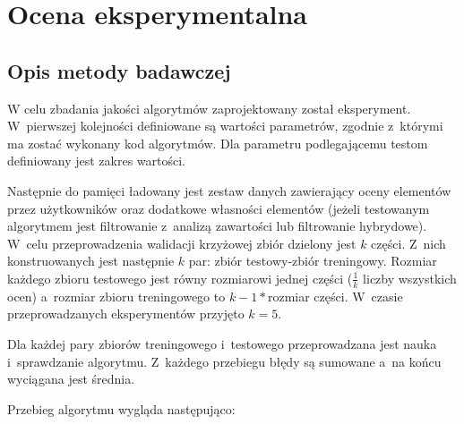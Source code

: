 \documentclass[twoside]{iisthesis}
\begin{document}
\chapter{Ocena eksperymentalna}
	\section{Opis metody badawczej}
	
		W celu zbadania jakości algorytmów zaprojektowany został eksperyment. W~pierwszej kolejności definiowane są wartości parametrów, zgodnie z~którymi ma zostać wykonany kod algorytmów. 
		Dla parametru podlegającemu testom definiowany jest zakres wartości. 
		
		Następnie do pamięci ładowany jest zestaw danych zawierający oceny elementów przez użytkowników oraz dodatkowe własności elementów (jeżeli testowanym algorytmem jest filtrowanie z~analizą zawartości lub filtrowanie hybrydowe). W~celu przeprowadzenia walidacji krzyżowej zbiór dzielony jest $k$ części. Z~nich konstruowanych jest następnie $k$ par: zbiór testowy-zbiór treningowy. Rozmiar każdego zbioru testowego jest równy rozmiarowi jednej części ($\frac{1}{k}$ liczby wszystkich ocen) a~rozmiar zbioru treningowego to $k-1*$rozmiar części. W~czasie przeprowadzanych eksperymentów przyjęto $k=5$.
		
		Dla każdej pary zbiorów treningowego i~testowego przeprowadzana jest nauka i~sprawdzanie algorytmu. Z~każdego przebiegu błędy są sumowane a~na końcu wyciągana jest średnia.
		
		Przebieg algorytmu wygląda następująco:
		
\end{document}
